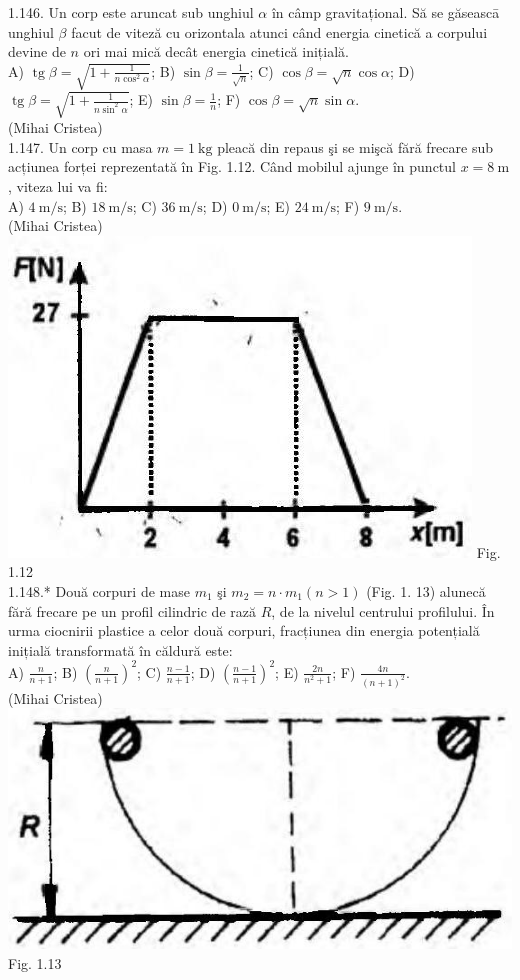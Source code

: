 1.146. Un corp este aruncat sub unghiul $\alpha$ în câmp gravitațional. Să se găseascā unghiul $\beta$ facut de viteză cu orizontala atunci când energia cinetică a corpului devine de $n$ ori mai mică decât energia cinetică inițială.\\ A) $\operatorname{tg} \beta=\sqrt{1+\frac{1}{n \cos ^{2} \alpha}}$; B) $\sin \beta=\frac{1}{\sqrt{n}}$; C) $\cos \beta=\sqrt{n} \cos \alpha$; D) $\operatorname{tg} \beta=\sqrt{1+\frac{1}{n \sin ^{2} \alpha}}$; E) $\sin \beta=\frac{1}{n}$; F) $\cos \beta=\sqrt{n} \sin \alpha$.\\ (Mihai Cristea)\\

1.147. Un corp cu masa $m=1 \mathrm{~kg}$ pleacă din repaus şi se mişcă fără frecare sub acțiunea forței reprezentată în Fig. 1.12. Când mobilul ajunge în punctul $x=8 \mathrm{~m}$, viteza lui va fi:\\ A) $4 \mathrm{~m} / \mathrm{s}$; B) $18 \mathrm{~m} / \mathrm{s}$; C) $36 \mathrm{~m} / \mathrm{s}$; D) $0 \mathrm{~m} / \mathrm{s}$; E) $24 \mathrm{~m} / \mathrm{s}$; F) $9 \mathrm{~m} / \mathrm{s}$.\\ (Mihai Cristea)\\ \includegraphics[width=0.4\linewidth]{images/2025_07_01_5b3ff9fa0d508c8e9f17g-035} Fig. 1.12\\

1.148.* Două corpuri de mase $m_{1}$ şi $m_{2}=n \cdot m_{1}(n>1)$ (Fig. 1. 13) alunecă fără frecare pe un profil cilindric de rază $R$, de la nivelul centrului profilului. În urma ciocnirii plastice a celor două corpuri, fracțiunea din energia potențială inițială transformată în căldură este:\\ A) $\frac{n}{n+1}$; B) $\left(\frac{n}{n+1}\right)^{2}$; C) $\frac{n-1}{n+1}$; D) $\left(\frac{n-1}{n+1}\right)^{2}$; E) $\frac{2 n}{n^{2}+1}$; F) $\frac{4 n}{(n+1)^{2}}$. \\ (Mihai Cristea)\\ \includegraphics[width=0.4\linewidth]{images/2025_07_01_5b3ff9fa0d508c8e9f17g-035(1)} Fig. 1.13\\

